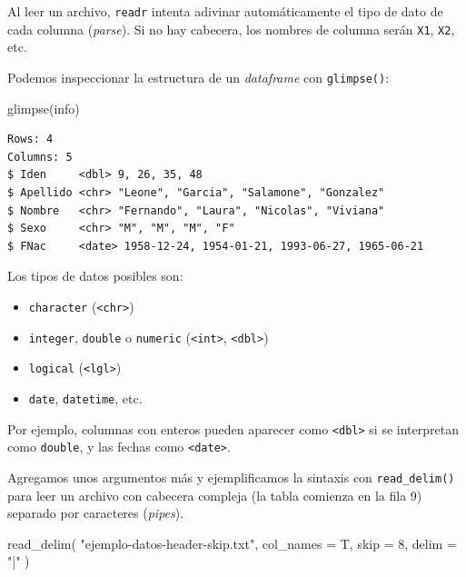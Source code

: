\documentclass[
  spanish,
  letterpaper,
  DIV=11,
  numbers=noendperiod]{scrreprt}
\newenvironment{Shaded}{\begin{snugshade}}{\end{snugshade}}
\newcommand{\AttributeTok}[1]{\textcolor[rgb]{0.40,0.45,0.13}{#1}}
\newcommand{\DecValTok}[1]{\textcolor[rgb]{0.68,0.00,0.00}{#1}}
\newcommand{\FunctionTok}[1]{\textcolor[rgb]{0.28,0.35,0.67}{#1}}
\newcommand{\NormalTok}[1]{\textcolor[rgb]{0.00,0.23,0.31}{#1}}
\newcommand{\StringTok}[1]{\textcolor[rgb]{0.13,0.47,0.30}{#1}}
\begin{document}
Al leer un archivo, \texttt{readr} intenta adivinar automáticamente el
tipo de dato de cada columna (\emph{parse}). Si no hay cabecera, los
nombres de columna serán \texttt{X1}, \texttt{X2}, etc.

Podemos inspeccionar la estructura de un \emph{dataframe} con
\texttt{glimpse()}:

\begin{Shaded}
\begin{Highlighting}[]
\FunctionTok{glimpse}\NormalTok{(info)}
\end{Highlighting}
\end{Shaded}

\begin{verbatim}
Rows: 4
Columns: 5
$ Iden     <dbl> 9, 26, 35, 48
$ Apellido <chr> "Leone", "Garcia", "Salamone", "Gonzalez"
$ Nombre   <chr> "Fernando", "Laura", "Nicolas", "Viviana"
$ Sexo     <chr> "M", "M", "M", "F"
$ FNac     <date> 1958-12-24, 1954-01-21, 1993-06-27, 1965-06-21
\end{verbatim}

Los tipos de datos posibles son:

\begin{itemize}
\item
  \texttt{character} (\texttt{\textless{}chr\textgreater{}})
\item
  \texttt{integer}, \texttt{double} o \texttt{numeric}
  (\texttt{\textless{}int\textgreater{}},
  \texttt{\textless{}dbl\textgreater{}})
\item
  \texttt{logical} (\texttt{\textless{}lgl\textgreater{}})
\item
  \texttt{date}, \texttt{datetime}, etc.
\end{itemize}

Por ejemplo, columnas con enteros pueden aparecer como
\texttt{\textless{}dbl\textgreater{}} si se interpretan como
\texttt{double}, y las fechas como
\texttt{\textless{}date\textgreater{}}.

Agregamos unos argumentos más y ejemplificamos la sintaxis con
\texttt{read\_delim()} para leer un archivo con cabecera compleja (la
tabla comienza en la fila 9) separado por caracteres \texttt{\textbar{}}
(\emph{pipes}).

\begin{Shaded}
\begin{Highlighting}[]
\FunctionTok{read\_delim}\NormalTok{(}
  \StringTok{"ejemplo{-}datos{-}header{-}skip.txt"}\NormalTok{,}
  \AttributeTok{col\_names =}\NormalTok{ T,}
  \AttributeTok{skip =} \DecValTok{8}\NormalTok{,}
  \AttributeTok{delim =} \StringTok{"|"}
\NormalTok{)}
\end{Highlighting}
\end{Shaded}
\end{document}
